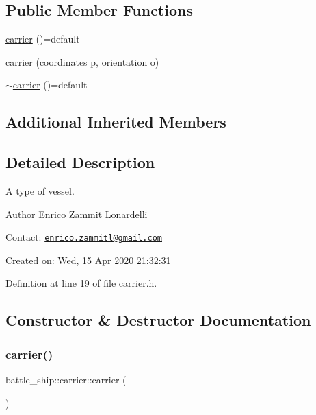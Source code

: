 \subsection*{Public Member Functions}
\begin{DoxyCompactItemize}
\item 
\hyperlink{classbattle__ship_1_1carrier_a9eaaa54c8884c25a1f99c397df789ca0}{carrier} ()=default
\item 
\hyperlink{classbattle__ship_1_1carrier_a3bb443575cd2f35ab21981b984c0fa02}{carrier} (\hyperlink{structbattle__ship_1_1coordinates}{coordinates} p, \hyperlink{namespacebattle__ship_aed87488f0a73f0d0679fe343fb61c784}{orientation} o)
\item 
\hyperlink{classbattle__ship_1_1carrier_a3642e56afffedbe7e20af863d0dde697}{$\sim$carrier} ()=default
\end{DoxyCompactItemize}
\subsection*{Additional Inherited Members}


\subsection{Detailed Description}
A type of vessel. 

\begin{DoxyAuthor}{Author}
Enrico Zammit Lonardelli
\end{DoxyAuthor}
Contact\+: \href{mailto:enrico.zammitl@gmail.com}{\tt enrico.\+zammitl@gmail.\+com}

Created on\+: Wed, 15 Apr 2020 21\+:32\+:31 

Definition at line 19 of file carrier.\+h.



\subsection{Constructor \& Destructor Documentation}
\mbox{\label{classbattle__ship_1_1carrier_a9eaaa54c8884c25a1f99c397df789ca0}} 
\subsubsection{\texorpdfstring{carrier()}{carrier()}\hspace{0.1cm}{\footnotesize\ttfamily [1/2]}}
{\footnotesize\ttfamily battle\+\_\+ship\+::carrier\+::carrier (\begin{DoxyParamCaption}{ }\end{DoxyParamCaption})\hspace{0.3cm}{\ttfamily [default]}}

